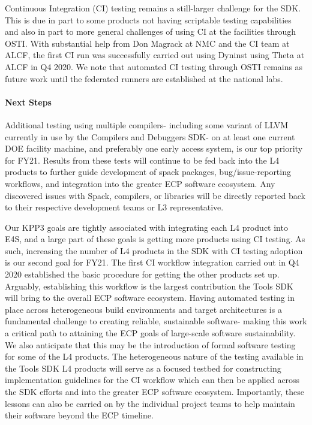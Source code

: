 Continuous Integration (CI) testing remains a still-larger challenge for the SDK. This is due in part to some products not having scriptable testing capabilities and also in part to more general challenges of using CI at the facilities through OSTI. With substantial help from Don Magrack at NMC and the CI team at ALCF, the first CI run was successfully carried out using Dyninst using Theta at ALCF in Q4 2020. We note that automated CI testing through OSTI remains as future work until the federated runners are established at the national labs.


\paragraph{Next Steps}
Additional testing using multiple compilers- including some variant of LLVM currently in use by the Compilers and Debuggers SDK- on at least one current DOE facility machine, and preferably one early access system, is our top priority for FY21. Results from these tests will continue to be fed back into the L4 products to further guide development of spack packages, bug/issue-reporting workflows, and integration into the greater ECP software ecosystem. Any discovered issues with Spack, compilers, or libraries will be directly reported back to their respective development teams or L3 representative.

Our KPP3 goals are tightly associated with integrating each L4 product into E4S, and a large part of these goals is getting more products using CI testing. As such, increasing the number of L4 products in the SDK with CI testing adoption is our second goal for FY21. The first CI workflow integration carried out in Q4 2020 established the basic procedure for getting the other products set up. Arguably, establishing this workflow is the largest contribution the Tools SDK will bring to the overall ECP software ecosystem. Having automated testing in place across heterogeneous build environments and target architectures is a fundamental challenge to creating reliable, sustainable software- making this work a critical path to attaining the ECP goals of large-scale software sustainability. We also anticipate that this may be the introduction of formal software testing for some of the L4 products. The heterogeneous nature of the testing available in the Tools SDK L4 products will serve as a focused testbed for constructing implementation guidelines for the CI workflow which can then be applied across the SDK efforts and into the greater ECP software ecosystem. Importantly, these lessons can also be carried on by the individual project teams to help maintain their software beyond the ECP timeline.
